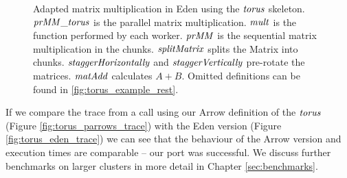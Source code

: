 \documentclass[paper=A4,twoside=true,openright,parskip=full,chapterprefix=true,headings=normal,bibliography=totoc,listof=totoc,titlepage=on,captions=tableabove,draft=false,british]{scrreprt}%
\begin{document}
\begin{figure}[t]
\resethooks
\caption[Adapted matrix multiplication in Eden using the \ensuremath{\Varid{torus}} skeleton.]{Adapted matrix multiplication in Eden using the \ensuremath{\Varid{torus}} skeleton. \ensuremath{\Varid{prMM\char95 torus}} is the parallel matrix multiplication. \ensuremath{\Varid{mult}} is the function performed by each worker. \ensuremath{\Varid{prMM}} is the sequential matrix multiplication in the chunks. \ensuremath{\Varid{splitMatrix}} splits the Matrix into chunks. \ensuremath{\Varid{staggerHorizontally}} and \ensuremath{\Varid{staggerVertically}} pre-rotate the matrices. \ensuremath{\Varid{matAdd}} calculates $A + B$. Omitted definitions can be found in \ref{fig:torus_example_rest}.}\label{fig:torusMatMult}\end{figure}

If we compare the trace from a call using our Arrow definition of the
\ensuremath{\Varid{torus}} (Figure \ref{fig:torus_parrows_trace}) with the Eden version
(Figure \ref{fig:torus_eden_trace}) we can see that the behaviour of the
Arrow version and execution times are comparable -- our port was
successful. We discuss further benchmarks on larger clusters in more
detail in Chapter \ref{sec:benchmarks}.
\end{document}
